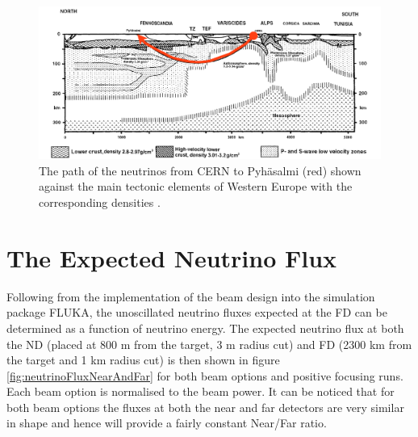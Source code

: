 \begin{figure}[htbp]
\begin{center}
\includegraphics[width=140mm]{Chapter2/figures/neutrinoPathInRock.png}
\caption{The path of the neutrinos from CERN to Pyh\"asalmi (red) shown against the main tectonic elements of Western Europe with the corresponding densities \cite{neutrinoPathInRock}\cite{lbnoInternal}.}
\label{fig:neutrinoPathInRock}
\end{center}
\end{figure}

\section{The Expected Neutrino Flux}
Following from the implementation of the beam design into the simulation package FLUKA\cite{fluka}, the unoscillated neutrino fluxes expected at the FD can be determined as a function of neutrino energy. The expected neutrino flux at both the ND (placed at 800 m from the target, 3 m radius cut) and FD (2300 km from the target and 1 km radius cut) is then shown in figure \ref{fig:neutrinoFluxNearAndFar} for both beam options and positive focusing runs. Each beam option is normalised to the beam power. It can be noticed that for both beam options the fluxes at both the near and far detectors are very similar in shape and hence will provide a fairly constant Near/Far ratio.

